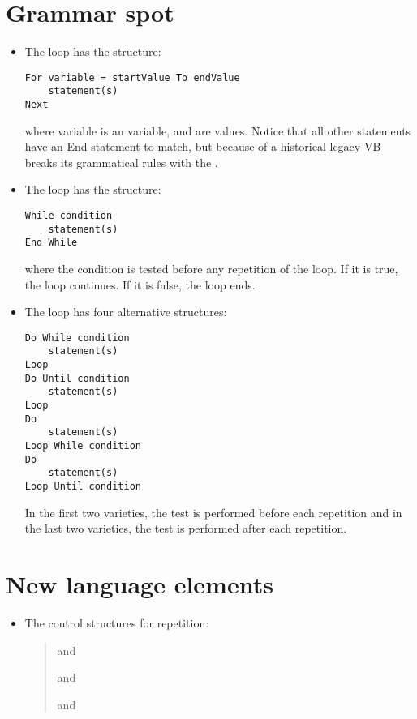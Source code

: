 	\section{Grammar spot}
		\begin{itemize}
	    \item The  loop has the structure:
				\begin{lstlisting}
For variable = startValue To endValue
	statement(s)
Next
				\end{lstlisting}
				where variable is an  variable,  and  are  values. Notice that all other statements have an End statement to match, but because of a historical legacy VB breaks its grammatical rules with the .
	    \item The  loop has the structure:
				\begin{lstlisting}
While condition
	statement(s)
End While
				\end{lstlisting}
				where the condition is tested before any repetition of the loop. If it is true, the loop continues. If it is false, the loop ends.
	    \item The  loop has four alternative structures:
				\begin{lstlisting}
Do While condition
	statement(s)
Loop
Do Until condition
	statement(s)
Loop
Do
	statement(s)
Loop While condition
Do
	statement(s)
Loop Until condition
				\end{lstlisting}
				In the first two varieties, the test is performed before each repetition and in the last two varieties, the test is performed after each repetition.
		\end{itemize}


	\section{New language elements}
	\begin{itemize}
    \item The control structures for repetition:
			\begin{quote}
 and 

 and 

 and 
			\end{quote}
	\end{itemize}



